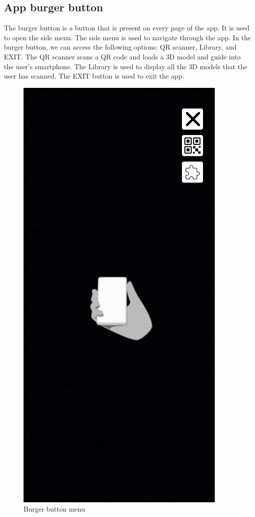 \subsection{App burger button}
The burger button is a button that is present on every page of the app. It is used to open the side menu. The side menu is used to navigate through the app. In the burger button, we can access the following options: \ac{QR} scanner, Library, and EXIT.
The \ac{QR} scanner scans a \ac{QR} code and loads a \ac{3D} model and guide into the user's smartphone. The Library is used to display all the \ac{3D} models that the user has scanned. The EXIT button is used to exit the app.
\begin{figure}[h!]
    \begin{center}
        \includegraphics[scale=0.5]{img/App_mock/iPhone 14 - 2.png}
        \caption{Burger button menu}
        \label{fig:burger-button}
    \end{center}
\end{figure}
\pagebreak

